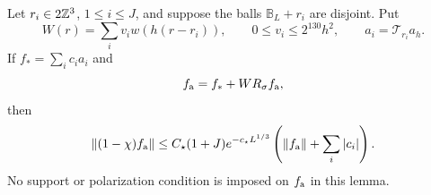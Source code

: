 \begin{lemma}
\label{c:lem:leakage}
Let $r_i\in2\mathbb Z^3$, $1\le i\le J$, and suppose the balls
$\mathbb B_L+r_i$ are disjoint. Put
\[
 W(r)=\sum_i v_iw(h(r-r_i)),\qquad
 0\le v_i\le2^{130}h^2,
 \qquad a_i=\mathcal T_{r_i}a_h.
\]
If $f_* =\sum_i c_i a_i$ and
\begin{equation}
 f_{\rm a}=f_*+WR_\sigma f_{\rm a},                                  \label{c:eq:tequation}
\end{equation}
then
\begin{equation}
 \left\lVert (1-\chi)f_{\rm a}\right\rVert\le
 C_\star(1+J)e^{-c_\star L^{1/3}}
       \left(\left\lVert f_{\rm a}\right\rVert+\sum_i|c_i|\right).             \label{c:eq:leakage}
\end{equation}
No support or polarization condition is imposed on $f_{\rm a}$ in this lemma.
\end{lemma}
